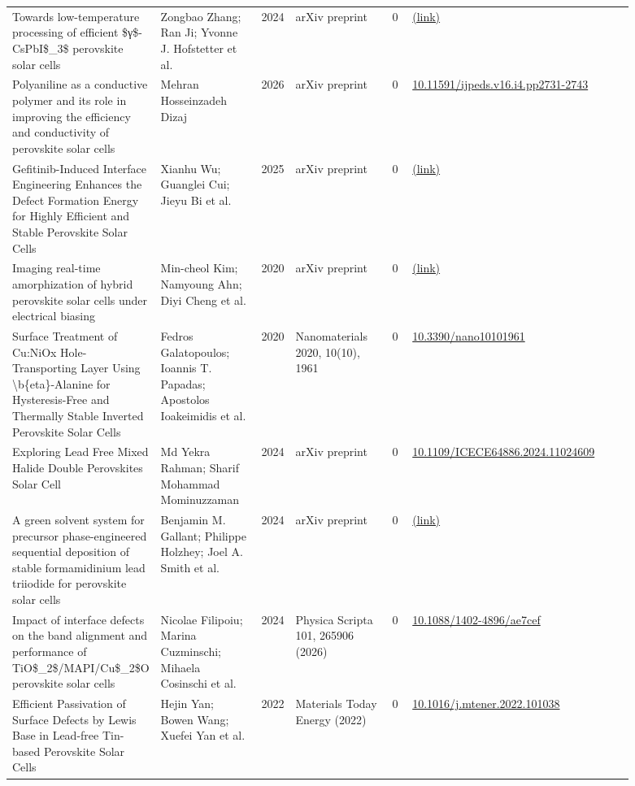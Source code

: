 \documentclass[10pt,a4paper]{article}
\begin{document}
{\begin{longtable}{p{0.197\linewidth}p{0.197\linewidth}p{0.043\linewidth}p{0.197\linewidth}p{0.043\linewidth}p{0.117\linewidth}p{0.098\linewidth}}
Towards low-temperature processing of efficient \$γ\$-CsPbI\$\_3\$ perovskite solar cells & Zongbao Zhang; Ran Ji; Yvonne J. Hofstetter et al. & 2024 & arXiv preprint & 0 & \href{http://arxiv.org/abs/2404.11636v1}{(link)} &  \\
Polyaniline as a conductive polymer and its role in improving the efficiency and conductivity of perovskite solar cells & Mehran Hosseinzadeh Dizaj & 2026 & arXiv preprint & 0 & \href{https://doi.org/10.11591/ijpeds.v16.i4.pp2731-2743}{10.11591/ijpeds.v16.i4.pp2731-2743} &  \\
Gefitinib-Induced Interface Engineering Enhances the Defect Formation Energy for Highly Efficient and Stable Perovskite Solar Cells & Xianhu Wu; Guanglei Cui; Jieyu Bi et al. & 2025 & arXiv preprint & 0 & \href{http://arxiv.org/abs/2506.03611v1}{(link)} &  \\
Imaging real-time amorphization of hybrid perovskite solar cells under electrical biasing & Min-cheol Kim; Namyoung Ahn; Diyi Cheng et al. & 2020 & arXiv preprint & 0 & \href{http://arxiv.org/abs/2010.12509v1}{(link)} &  \\
Surface Treatment of Cu:NiOx Hole-Transporting Layer Using \textbackslash{}b\{eta\}-Alanine for Hysteresis-Free and Thermally Stable Inverted Perovskite Solar Cells & Fedros Galatopoulos; Ioannis T. Papadas; Apostolos Ioakeimidis et al. & 2020 & Nanomaterials 2020, 10(10), 1961 & 0 & \href{https://doi.org/10.3390/nano10101961}{10.3390/nano10101961} &  \\
Exploring Lead Free Mixed Halide Double Perovskites Solar Cell & Md Yekra Rahman; Sharif Mohammad Mominuzzaman & 2024 & arXiv preprint & 0 & \href{https://doi.org/10.1109/ICECE64886.2024.11024609}{10.1109/ICECE64886.2024.11024609} &  \\
A green solvent system for precursor phase-engineered sequential deposition of stable formamidinium lead triiodide for perovskite solar cells & Benjamin M. Gallant; Philippe Holzhey; Joel A. Smith et al. & 2024 & arXiv preprint & 0 & \href{http://arxiv.org/abs/2406.08441v2}{(link)} &  \\
Impact of interface defects on the band alignment and performance of TiO\$\_2\$/MAPI/Cu\$\_2\$O perovskite solar cells & Nicolae Filipoiu; Marina Cuzminschi; Mihaela Cosinschi et al. & 2024 & Physica Scripta 101, 265906 (2026) & 0 & \href{https://doi.org/10.1088/1402-4896/ae7cef}{10.1088/1402-4896/ae7cef} &  \\
Efficient Passivation of Surface Defects by Lewis Base in Lead-free Tin-based Perovskite Solar Cells & Hejin Yan; Bowen Wang; Xuefei Yan et al. & 2022 & Materials Today Energy (2022) & 0 & \href{https://doi.org/10.1016/j.mtener.2022.101038}{10.1016/j.mtener.2022.101038} &  \\

\end{longtable}}
\end{document}
